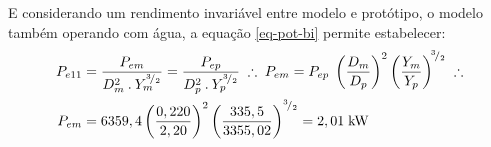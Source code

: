     E considerando um rendimento invariável entre modelo e protótipo, o modelo também operando com água, a equação \eqref{eq-pot-bi} permite estabelecer:
    \begin{equation*}
        \begin{split}
            P_{e11} &= \frac{P_{em}}{D_m^2 \: . \: Y_m^{{}^{3}\!/_{2}}} = \frac{P_{ep}}{D_p^2 \: . \: Y_p^{{}^{3}\!/_{2}}} \; \therefore \; P_{em} = P_{ep} \; \left( \frac{D_m}{D_p} \right)^2 \left( \frac{Y_m}{Y_p} \right)^{ \! {}^{3}\!/_{2}} \; \therefore  \\
            P_{em} &= 6359,4 \left( \frac{0,220}{2,20} \right)^2 \left( \frac{335,5}{3355,02} \right)^{{}^{3}\!/_{2}} = 2,01 \; \mbox{kW} 
        \end{split}
    \end{equation*}
